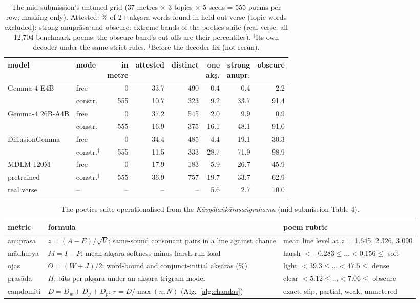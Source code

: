 \documentclass[11pt]{article}
\begin{document}
\begin{table}[H]
\centering\tiny\setlength{\tabcolsep}{1.8pt}
\begin{tabular}{@{}llrrrrrr@{}}
\toprule
model & mode & \makecell[r]{in\\metre} & attested & distinct & \makecell[r]{one\\akṣ.} & \makecell[r]{strong\\anupr.} & obscure \\
\midrule
Gemma-4 E4B & free & 0 & 33.7 & 490 & 0.4 & 0.4 & 2.2 \\
 & constr. & 555 & 10.7 & 323 & 9.2 & 33.7 & 91.4 \\
Gemma-4 26B-A4B & free & 0 & 37.2 & 545 & 2.0 & 9.9 & 0.9 \\
 & constr. & 555 & 16.9 & 375 & 16.1 & 48.1 & 91.0 \\
DiffusionGemma & free & 0 & 34.4 & 485 & 4.4 & 19.1 & 30.3 \\
 & constr.$^\dagger$ & 555 & 11.5 & 333 & 28.7 & 71.9 & 98.9 \\
MDLM-120M & free & 0 & 17.9 & 183 & 5.9 & 26.7 & 45.9 \\
\enspace pretrained & constr.$^\ddagger$ & 555 & 36.9 & 757 & 19.7 & 33.7 & 62.9 \\
real verse & -- & -- & -- & -- & 5.6 & 2.7 & 10.0 \\
\bottomrule
\end{tabular}
\caption{The mid-submission's untuned grid (37 metres $\times$ 3 topics $\times$ 5 seeds = 555 poems per row;
masking only). Attested: \% of 2+-akṣara words found in held-out verse (topic words excluded); strong
anuprāsa and obscure: extreme bands of the poetics suite (real verse: all 12,704 benchmark poems; the obscure
band's cut-offs are their percentiles). $^\ddagger$Its own decoder under the same strict rules. $^\dagger$Before the decoder fix (not rerun).}
\label{tab:sept}
\end{table}

\begin{table}[H]
\centering\tiny\setlength{\tabcolsep}{2pt}
\begin{tabularx}{\columnwidth}{@{}lYl@{}}
\toprule
metric & formula & poem rubric \\
\midrule
anuprāsa & $z = (A - E)/\sqrt{V}$: same-sound consonant pairs in a line against chance & mean line level at $z$ = 1.645, 2.326, 3.090 \\
mādhurya & $M = I - P$: mean akṣara softness minus harsh-run load & harsh $< -0.283 \leq \dots < 0.156 \leq$ soft \\
ojas & $O = (W + J)/2$: word-bound and conjunct-initial akṣaras (\%) & light $< 39.3 \leq \dots < 47.5 \leq$ dense \\
prasāda & $H$, bits per akṣara under an akṣara trigram model & clear $< 5.12 \leq \dots < 7.06 \leq$ obscure \\
caṃdomiti & $D = D_w + D_y + D_p$; $r = D/\max(n, N)$ (Alg.~\ref{alg:chandas}) & exact, slip, partial, weak, unmetered \\
\bottomrule
\end{tabularx}
\caption{The poetics suite operationalised from the \textit{Kāvyālaṅkārasaṅgrahamu} (mid-submission Table 4).}
\label{tab:metrics}
\end{table}
\end{document}
